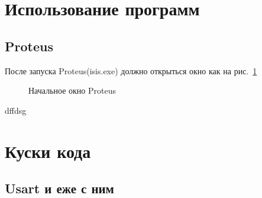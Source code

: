 \documentclass[12pt]{article}
\begin{document}
\section{Использование программ}
\subsection{Proteus}
После запуска Proteus(isis.exe) должно открыться окно как на рис.~\ref{p1} 


\begin{figure}[h]
\caption{Начальное окно Proteus}
\label{p1}
\end{figure}
dffdsg
\section{Куски кода}

\subsection{}
\subsection{}
\subsection{Usart и еже с ним}
\subsection{}
\end{document}
